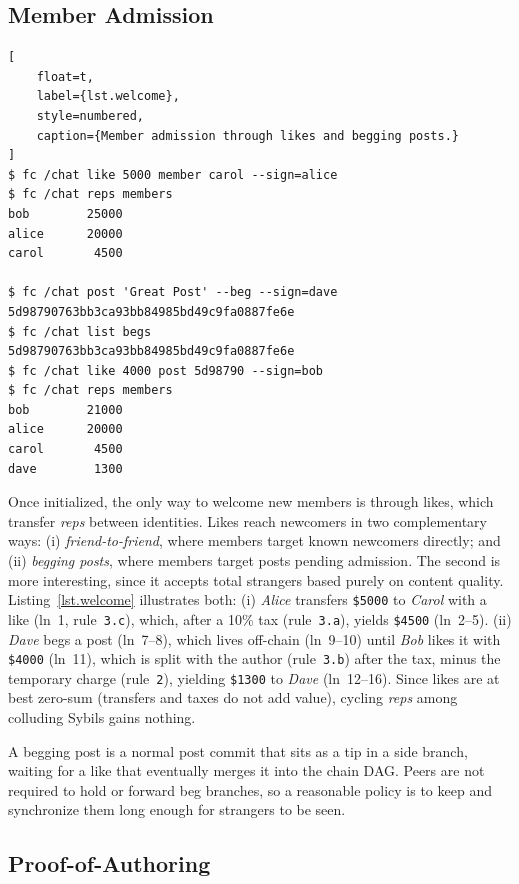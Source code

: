 \documentclass[10pt,twocolumn]{article}
\newcommand{\R}[1]     {rule~\code{#1}\xspace}
\newcommand{\reps}     {\emph{reps}\xspace}
\newcommand{\nreps}[1] {\code{\$#1\xspace}}
\newcommand{\code}[1]  {\texttt{\small{#1}}}
\begin{document}
\subsection{Member Admission}
\label{sec.design.members}

\begin{lstlisting}[
    float=t,
    label={lst.welcome},
    style=numbered,
    caption={Member admission through likes and begging posts.}
]
$ fc /chat like 5000 member carol --sign=alice
$ fc /chat reps members
bob        25000
alice      20000
carol       4500

$ fc /chat post 'Great Post' --beg --sign=dave
5d98790763bb3ca93bb84985bd49c9fa0887fe6e
$ fc /chat list begs
5d98790763bb3ca93bb84985bd49c9fa0887fe6e
$ fc /chat like 4000 post 5d98790 --sign=bob
$ fc /chat reps members
bob        21000
alice      20000
carol       4500
dave        1300
\end{lstlisting}

Once initialized, the only way to welcome new members is through likes, which
transfer \reps between identities.
%
Likes reach newcomers in two complementary ways:
    (i) \emph{friend-to-friend}, where members target known newcomers directly;
        and
    (ii) \emph{begging posts}, where members target posts pending admission.
%
The second is more interesting, since it accepts total strangers based purely
on content quality.
%
Listing~\ref{lst.welcome} illustrates both:
%
(i) \emph{Alice} transfers \nreps{5000} to \emph{Carol} with a like (ln~1,
\R{3.c}), which, after a 10\% tax (\R{3.a}), yields \nreps{4500} (ln~2--5).
%
(ii) \emph{Dave} begs a post (ln~7--8), which lives off-chain (ln~9--10) until
\emph{Bob} likes it with \nreps{4000} (ln~11), which is split with the author
(\R{3.b}) after the tax, minus the temporary charge (\R{2}), yielding
\nreps{1300} to \emph{Dave} (ln~12--16).
%
Since likes are at best zero-sum (transfers and taxes do not add value),
cycling \reps among colluding Sybils gains nothing.

A begging post is a normal post commit that sits as a tip in a side branch,
waiting for a like that eventually merges it into the chain DAG.
Peers are not required to hold or forward beg branches, so a reasonable policy
is to keep and synchronize them long enough for strangers to be seen.

\subsection{Proof-of-Authoring}
\label{sec.design.poa}
\end{document}
